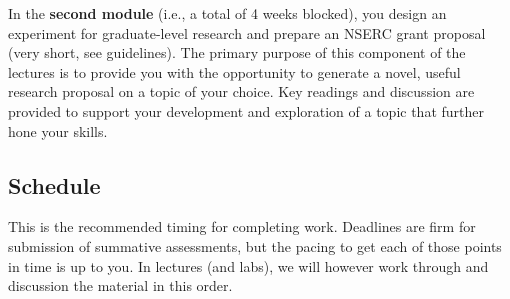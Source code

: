 \documentclass[
]{book}
\begin{document}
In the \textbf{second module} (i.e., a total of 4 weeks blocked), you design an experiment for graduate-level research and prepare an NSERC grant proposal (very short, see guidelines). The primary purpose of this component of the lectures is to provide you with the opportunity to generate a novel, useful research proposal on a topic of your choice. Key readings and discussion are provided to support your development and exploration of a topic that further hone your skills.

\hypertarget{schedule}{%
\subsection*{Schedule}\label{schedule}}

This is the recommended timing for completing work. Deadlines are firm for submission of summative assessments, but the pacing to get each of those points in time is up to you. In lectures (and labs), we will however work through and discussion the material in this order.
\end{document}
